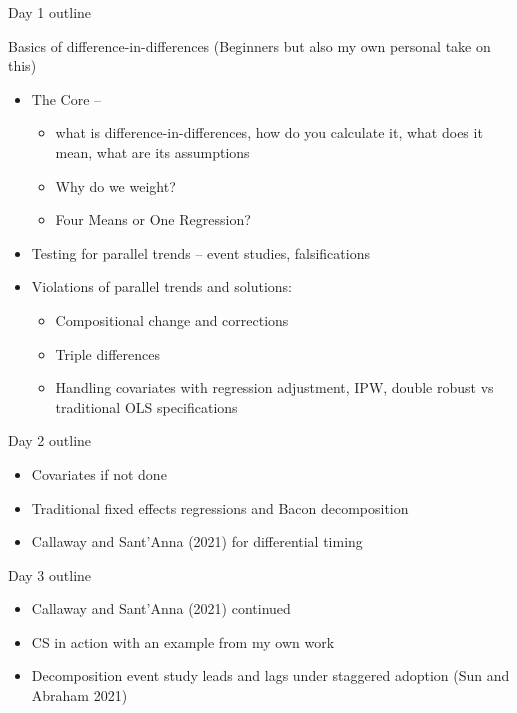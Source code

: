 \documentclass{beamer}
\begin{document}
\begin{frame}{Day 1 outline}

Basics of difference-in-differences (Beginners but also my own personal take on this)
	\begin{itemize}
	\item The Core --
		\begin{itemize}
		\item what is difference-in-differences, how do you calculate it, what does it mean, what are its assumptions
		\item Why do we weight?
		\item Four Means or One Regression?
		\end{itemize}
	\item Testing for parallel trends -- event studies, falsifications
	\item Violations of parallel trends and solutions:
		\begin{itemize}
		\item Compositional change and corrections
		\item Triple differences
		\item Handling covariates with regression adjustment, IPW, double robust vs traditional OLS specifications
		\end{itemize}
	\end{itemize}

\end{frame}


\begin{frame}{Day 2 outline}

	\begin{itemize}
	\item Covariates if not done
	\item Traditional fixed effects regressions and Bacon decomposition
	\item Callaway and Sant'Anna (2021) for differential timing
	\end{itemize}

\end{frame}


\begin{frame}{Day 3 outline}


\begin{itemize}
\item Callaway and Sant'Anna (2021) continued
\item CS in action with an example from my own work
\item Decomposition event study leads and lags under staggered adoption (Sun and Abraham 2021)
\end{itemize}

\end{frame}
\end{document}
